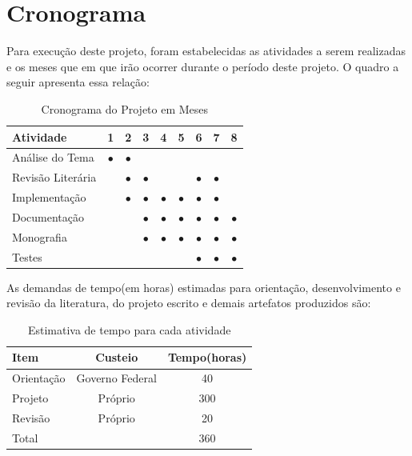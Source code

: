 \documentclass[
	12pt,				    %
	openright,			    %
	oneside,			    %
	a4paper,			    %
    sumario=tradicional,    %
	english,			    %
	brazil,				    %
	]{abntex2}              %
\begin{document}
\chapter{Cronograma}\label{sec:cronograma}

Para execução deste projeto, foram estabelecidas as atividades a serem realizadas e os meses que em que irão ocorrer durante o período deste projeto. O quadro a seguir apresenta essa relação:

\par

\begin{table}[htbp]
	\centering
	\caption[Cronograma mensal]{Cronograma do Projeto em Meses}
	\label{tab:cronogramaMensal}
	\begin{tabular}{lcccccccc} %
		\toprule
		\textbf{Atividade} & \textbf{1} & \textbf{2} & \textbf{3} & \textbf{4} & \textbf{5} & \textbf{6} & \textbf{7} & \textbf{8} \\
		\midrule
		Análise do Tema    & $\bullet$  & $\bullet$  &            &            &            &            &            &            \\
		Revisão Literária  &            & $\bullet$  & $\bullet$  &            &            & $\bullet$  & $\bullet$  &            \\
		Implementação      &            & $\bullet$  & $\bullet$  & $\bullet$  & $\bullet$  & $\bullet$  & $\bullet$  &            \\
		Documentação       &            &            & $\bullet$  & $\bullet$  & $\bullet$  & $\bullet$  & $\bullet$  & $\bullet$  \\
		Monografia         &            &            & $\bullet$  & $\bullet$  & $\bullet$  & $\bullet$  & $\bullet$  & $\bullet$  \\
		Testes             &            &            &            &            &            & $\bullet$  & $\bullet$  & $\bullet$  \\
		\bottomrule
	\end{tabular}
\end{table}

As demandas de tempo(em horas) estimadas para orientação, desenvolvimento e revisão da literatura, do projeto escrito e demais artefatos produzidos são:

\par

\begin{table}[htpb]
	\centering
	\caption[Cronograma em horas]{Estimativa de tempo para cada atividade}
	\label{tab:cronogramaHoras}
	\begin{tabular}{lcc}
		\toprule
		\textbf{Item} & \textbf{Custeio} & \textbf{Tempo(horas)} \\
		\midrule
		Orientação    & Governo Federal  & 40                    \\
		Projeto       & Próprio          & 300                   \\
		Revisão       & Próprio          & 20                    \\
		\bottomrule
		Total         &                  & 360
	\end{tabular}
\end{table}
\end{document}
